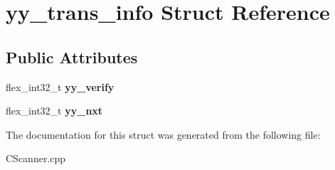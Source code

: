 \hypertarget{structyy__trans__info}{\section{yy\-\_\-trans\-\_\-info Struct Reference}
\label{structyy__trans__info}
}
\subsection*{Public Attributes}
\begin{DoxyCompactItemize}
\item 
\hypertarget{structyy__trans__info_a5c9f61e770deef50bd4e697310342fe9}{flex\-\_\-int32\-\_\-t {\bfseries yy\-\_\-verify}}\label{structyy__trans__info_a5c9f61e770deef50bd4e697310342fe9}

\item 
\hypertarget{structyy__trans__info_ae0715250c2bef261e596e77e0030f13e}{flex\-\_\-int32\-\_\-t {\bfseries yy\-\_\-nxt}}\label{structyy__trans__info_ae0715250c2bef261e596e77e0030f13e}

\end{DoxyCompactItemize}


The documentation for this struct was generated from the following file\-:\begin{DoxyCompactItemize}
\item 
C\-Scanner.\-cpp\end{DoxyCompactItemize}
